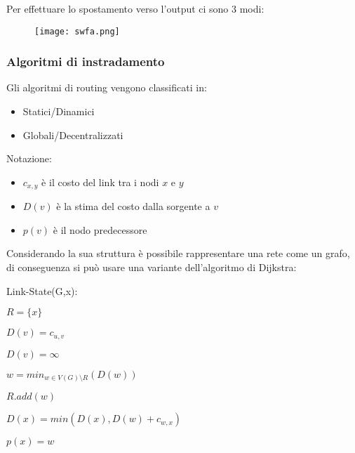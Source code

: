 \documentclass{article}
\begin{document}
\noindent Per effettuare lo spostamento verso l'output ci sono 3 modi:

\begin{figure}[ht]
    \centering
    \texttt{[image: swfa.png]}
    \label{fig:sw_fa}
\end{figure}

\subsubsection{Algoritmi di instradamento}

Gli algoritmi di routing vengono classificati in:
\begin{itemize}
    \item Statici/Dinamici
    \item Globali/Decentralizzati\newline
\end{itemize}

\noindent Notazione:
\begin{itemize}
    \item $c_{x,y}$ è il costo del link tra i nodi $x$ e $y$
    \item $D(v)$ è la stima del costo dalla sorgente a $v$
    \item $p(v)$ è il nodo predecessore\newline
\end{itemize}

\noindent Considerando la sua struttura è possibile rappresentare una rete come un grafo, di conseguenza si può usare una variante dell'algoritmo di Dijkstra:

\begin{algorithm}[ht]
\begin{algorithmic}
\State Link-State(G,x):

\State $R=\{x\}$



        \State $D(v)=c_{u,v}$

    \Else

        \State $D(v)=\infty$

    \EndIf

\EndFor


    \State $w=min_{w\in V(G)\setminus R}(D(w))$

    \State $R.add(w)$



            \State $D(x)=min(D(x),D(w)+c_{w,x})$

            \State $p(x)=w$

        \EndIf

    \EndFor

\EndWhile

\end{algorithmic}
\end{algorithm}
\end{document}
